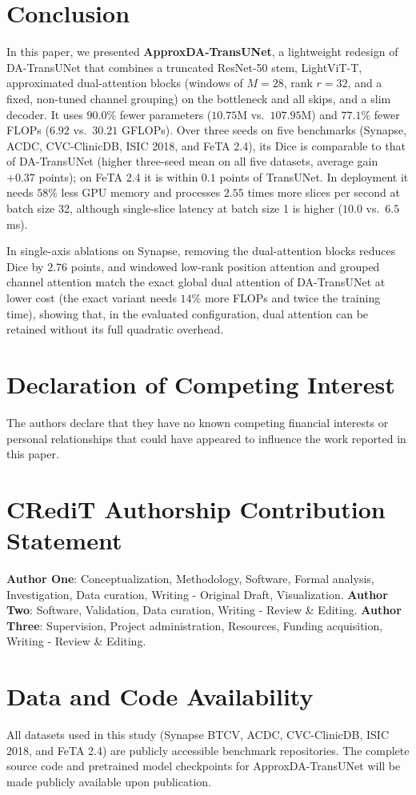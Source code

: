 \section{Conclusion}
\label{sec:conclusion}

In this paper, we presented \textbf{ApproxDA-TransUNet}, a lightweight redesign of DA-TransUNet that combines a truncated ResNet-50 stem, LightViT-T, approximated dual-attention blocks (windows of $M=28$, rank $r=32$, and a fixed, non-tuned channel grouping) on the bottleneck and all skips, and a slim decoder. It uses $90.0\%$ fewer parameters ($10.75$M vs.\ $107.95$M) and $77.1\%$ fewer FLOPs ($6.92$ vs.\ $30.21$ GFLOPs). Over three seeds on five benchmarks (Synapse, ACDC, CVC-ClinicDB, ISIC 2018, and FeTA 2.4), its Dice is comparable to that of DA-TransUNet (higher three-seed mean on all five datasets, average gain $+0.37$ points); on FeTA 2.4 it is within $0.1$ points of TransUNet. In deployment it needs $58\%$ less GPU memory and processes $2.55$ times more slices per second at batch size 32, although single-slice latency at batch size 1 is higher ($10.0$ vs.\ $6.5$ ms).

In single-axis ablations on Synapse, removing the dual-attention blocks reduces Dice by $2.76$ points, and windowed low-rank position attention and grouped channel attention match the exact global dual attention of DA-TransUNet at lower cost (the exact variant needs $14\%$ more FLOPs and twice the training time), showing that, in the evaluated configuration, dual attention can be retained without its full quadratic overhead.

\section*{Declaration of Competing Interest}
The authors declare that they have no known competing financial interests or personal relationships that could have appeared to influence the work reported in this paper.

\section*{CRediT Authorship Contribution Statement}
\textbf{Author One}: Conceptualization, Methodology, Software, Formal analysis, Investigation, Data curation, Writing - Original Draft, Visualization.
\textbf{Author Two}: Software, Validation, Data curation, Writing - Review \& Editing.
\textbf{Author Three}: Supervision, Project administration, Resources, Funding acquisition, Writing - Review \& Editing.

\section*{Data and Code Availability}
All datasets used in this study (Synapse BTCV, ACDC, CVC-ClinicDB, ISIC 2018, and FeTA 2.4) are publicly accessible benchmark repositories. The complete source code and pretrained model checkpoints for ApproxDA-TransUNet will be made publicly available upon publication.
